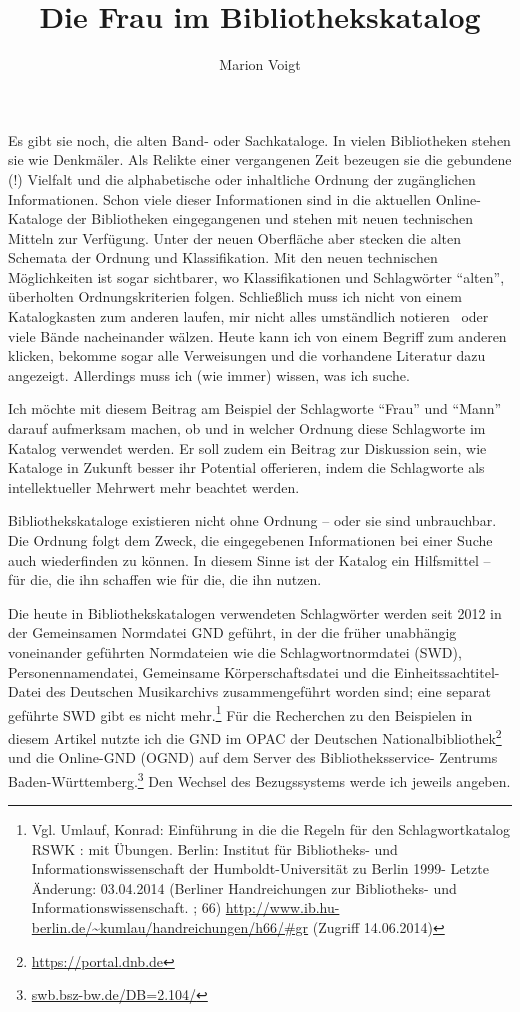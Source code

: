 \documentclass[a4paper,
fontsize=11pt,
oneside,
numbers=noperiodatend,
parskip=half-,
bibliography=totoc,
final
]{scrartcl}
\title{\LARGE{Die Frau im Bibliothekskatalog}} %
\author{Marion Voigt} %
\date{}
\begin{document}
\maketitle
\thispagestyle{fancyplain} 


Es gibt sie noch, die alten Band- oder Sachkataloge. In vielen
Bibliotheken stehen sie wie Denkmäler. Als Relikte einer vergangenen
Zeit bezeugen sie die gebundene (!) Vielfalt und die alphabetische oder
inhaltliche Ordnung der zugänglichen Informationen. Schon viele dieser
Informationen sind in die aktuellen Online-Kataloge der Bibliotheken
eingegangenen und stehen mit neuen technischen Mitteln zur Verfügung.
Unter der neuen Oberfläche aber stecken die alten Schemata der Ordnung
und Klassifikation. Mit den neuen technischen Möglichkeiten ist sogar
sichtbarer, wo Klassifikationen und Schlagwörter \enquote{alten},
überholten Ordnungskriterien folgen. Schließlich muss ich nicht von
einem Katalogkasten zum anderen laufen, mir nicht alles umständlich
notieren~ oder viele Bände nacheinander wälzen. Heute kann ich von einem
Begriff zum anderen klicken, bekomme sogar alle Verweisungen und die
vorhandene Literatur dazu angezeigt. Allerdings muss ich (wie immer)
wissen, was ich suche.~

Ich möchte mit diesem Beitrag am Beispiel der Schlagworte \enquote{Frau}
und \enquote{Mann} darauf aufmerksam machen, ob und in welcher Ordnung
diese Schlagworte im Katalog verwendet werden. Er soll zudem ein Beitrag
zur Diskussion sein, wie Kataloge in Zukunft besser ihr Potential
offerieren, indem die Schlagworte als intellektueller Mehrwert mehr
beachtet werden.

Bibliothekskataloge existieren nicht ohne Ordnung -- oder sie sind
unbrauchbar. Die Ordnung folgt dem Zweck, die eingegebenen Informationen
bei einer Suche auch wiederfinden zu können. In diesem Sinne ist der
Katalog ein Hilfsmittel -- für die, die ihn schaffen wie für die, die
ihn nutzen.

Die heute in Bibliothekskatalogen verwendeten Schlagwörter werden seit
2012 in der Gemeinsamen Normdatei GND geführt, in der die früher
unabhängig voneinander geführten Normdateien wie die Schlagwortnormdatei
(SWD), Personennamendatei, Gemeinsame Körperschaftsdatei und die
Einheitssachtitel-Datei des Deutschen Musikarchivs zusammengeführt
worden sind; eine separat geführte SWD gibt es nicht mehr.\footnote{Vgl.
  Umlauf, Konrad: Einführung in die die Regeln für den Schlagwortkatalog
  RSWK : mit Übungen. Berlin: Institut für Bibliotheks- und
  Informationswissenschaft der Humboldt-Universität zu Berlin 1999-
  Letzte Änderung: 03.04.2014 (Berliner Handreichungen zur Bibliotheks-
  und Informationswissenschaft. ; 66)
  \href{http://www.ib.hu-berlin.de/~kumlau/handreichungen/h66/xgr}{http://www.ib.hu-berlin.de/\textasciitilde{}kumlau/handreichungen/h66/\#gr}
  (Zugriff 14.06.2014)} Für die Recherchen zu den Beispielen in diesem
Artikel nutzte ich die GND im OPAC der Deutschen
Nationalbibliothek\footnote{\url{https://portal.dnb.de}} und die
Online-GND (OGND) auf dem Server des Bibliotheksservice- Zentrums
Baden-Württemberg.\footnote{\url{swb.bsz-bw.de/DB=2.104/}} Den Wechsel
des Bezugssystems werde ich jeweils angeben.
\end{document}
